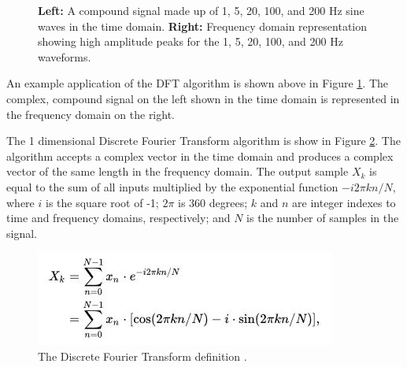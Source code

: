 \documentclass[11pt,a4paper]{article}
\begin{document}
\begin{figure}[H]%
    \centering
    \qquad
    \vspace{5pt}
    \caption{\textbf{Left:} A compound signal made up of 1, 5, 20, 100, and 200 Hz sine waves in the time domain. \textbf{Right:} Frequency domain representation showing high amplitude peaks for the 1, 5, 20, 100, and 200 Hz waveforms.}%
    \label{fig:dft_demo}%
\end{figure}

An example application of the DFT algorithm is shown above in Figure \ref{fig:dft_demo}. The complex, compound signal on the left shown in the time domain is represented in the frequency domain on the right.

The 1 dimensional Discrete Fourier Transform algorithm is show in Figure \ref{fig:dft_algorithm}. The algorithm accepts a complex vector in the time domain and produces a complex vector of the same length in the frequency domain. The output sample $X_{k}$ is equal to the sum of all inputs multiplied by the exponential function $-i2$$\pi$$kn/N$, where $i$ is the square root of -1; $2$$\pi$ is 360 degrees; $k$ and $n$ are integer indexes to time and frequency domains, respectively; and $N$ is the number of samples in the signal.

\begin{figure}[H]
\begin{center}
\includegraphics[scale=1]{dft_algorithm}
\end{center}
\caption{The Discrete Fourier Transform definition \citep{wikipedia:dft}.}
\label{fig:dft_algorithm}
\end{figure}
\end{document}
